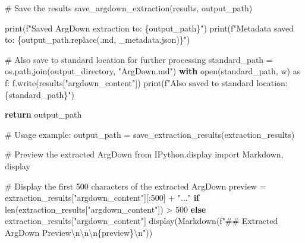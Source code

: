 \documentclass[
  11pt,
  letterpaper,
]{book}
\newenvironment{Shaded}{\begin{snugshade}}{\end{snugshade}}
\newcommand{\BuiltInTok}[1]{\textcolor[rgb]{0.00,0.23,0.31}{#1}}
\newcommand{\CharTok}[1]{\textcolor[rgb]{0.13,0.47,0.30}{#1}}
\newcommand{\CommentTok}[1]{\textcolor[rgb]{0.37,0.37,0.37}{#1}}
\newcommand{\ControlFlowTok}[1]{\textcolor[rgb]{0.00,0.23,0.31}{\textbf{#1}}}
\newcommand{\DecValTok}[1]{\textcolor[rgb]{0.68,0.00,0.00}{#1}}
\newcommand{\ImportTok}[1]{\textcolor[rgb]{0.00,0.46,0.62}{#1}}
\newcommand{\NormalTok}[1]{\textcolor[rgb]{0.00,0.23,0.31}{#1}}
\newcommand{\OperatorTok}[1]{\textcolor[rgb]{0.37,0.37,0.37}{#1}}
\newcommand{\SpecialCharTok}[1]{\textcolor[rgb]{0.37,0.37,0.37}{#1}}
\newcommand{\SpecialStringTok}[1]{\textcolor[rgb]{0.13,0.47,0.30}{#1}}
\newcommand{\StringTok}[1]{\textcolor[rgb]{0.13,0.47,0.30}{#1}}
\begin{document}
\begin{Shaded}
\begin{Highlighting}[]
    \CommentTok{\# Save the results}
\NormalTok{    save\_argdown\_extraction(results, output\_path)}

    \BuiltInTok{print}\NormalTok{(}\SpecialStringTok{f"Saved ArgDown extraction to: }\SpecialCharTok{\{}\NormalTok{output\_path}\SpecialCharTok{\}}\SpecialStringTok{"}\NormalTok{)}
    \BuiltInTok{print}\NormalTok{(}\SpecialStringTok{f"Metadata saved to: }\SpecialCharTok{\{}\NormalTok{output\_path}\SpecialCharTok{.}\NormalTok{replace(}\StringTok{\textquotesingle{}.md\textquotesingle{}}\NormalTok{, }\StringTok{\textquotesingle{}\_metadata.json\textquotesingle{}}\NormalTok{)}\SpecialCharTok{\}}\SpecialStringTok{"}\NormalTok{)}

    \CommentTok{\# Also save to standard location for further processing}
\NormalTok{    standard\_path }\OperatorTok{=}\NormalTok{ os.path.join(output\_directory, }\StringTok{"ArgDown.md"}\NormalTok{)}
    \ControlFlowTok{with} \BuiltInTok{open}\NormalTok{(standard\_path, }\StringTok{\textquotesingle{}w\textquotesingle{}}\NormalTok{) }\ImportTok{as}\NormalTok{ f:}
\NormalTok{        f.write(results[}\StringTok{"argdown\_content"}\NormalTok{])}
    \BuiltInTok{print}\NormalTok{(}\SpecialStringTok{f"Also saved to standard location: }\SpecialCharTok{\{}\NormalTok{standard\_path}\SpecialCharTok{\}}\SpecialStringTok{"}\NormalTok{)}

    \ControlFlowTok{return}\NormalTok{ output\_path}

\CommentTok{\# Usage example:}
\NormalTok{output\_path }\OperatorTok{=}\NormalTok{ save\_extraction\_results(extraction\_results)}

\CommentTok{\# Preview the extracted ArgDown}
\ImportTok{from}\NormalTok{ IPython.display }\ImportTok{import}\NormalTok{ Markdown, display}

\CommentTok{\# Display the first 500 characters of the extracted ArgDown}
\NormalTok{preview }\OperatorTok{=}\NormalTok{ extraction\_results[}\StringTok{"argdown\_content"}\NormalTok{][:}\DecValTok{500}\NormalTok{] }\OperatorTok{+} \StringTok{"..."} \ControlFlowTok{if} \BuiltInTok{len}\NormalTok{(extraction\_results[}\StringTok{"argdown\_content"}\NormalTok{]) }\OperatorTok{\textgreater{}} \DecValTok{500} \ControlFlowTok{else}\NormalTok{ extraction\_results[}\StringTok{"argdown\_content"}\NormalTok{]}
\NormalTok{display(Markdown(}\SpecialStringTok{f"\#\# Extracted ArgDown Preview}\CharTok{\textbackslash{}n\textbackslash{}n}\SpecialStringTok{\textasciigrave{}\textasciigrave{}\textasciigrave{}}\CharTok{\textbackslash{}n}\SpecialCharTok{\{}\NormalTok{preview}\SpecialCharTok{\}}\CharTok{\textbackslash{}n}\SpecialStringTok{\textasciigrave{}\textasciigrave{}\textasciigrave{}"}\NormalTok{))}
\end{Highlighting}
\end{Shaded}
\end{document}
